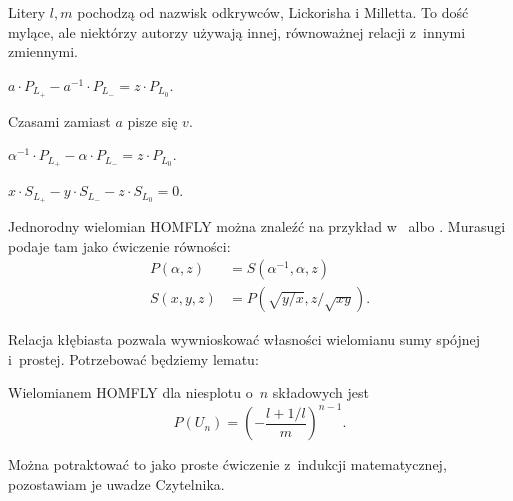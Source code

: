 Litery $l, m$ pochodzą od nazwisk odkrywców, Lickorisha i Milletta.
To dość mylące, ale niektórzy autorzy używają innej, równoważnej relacji z~innymi zmiennymi.

\begin{definition}
    $a \cdot P_{L_+} - a^{-1} \cdot P_{L_-} = z \cdot P_{L_0}$.
\end{definition}

Czasami zamiast $a$ pisze się $v$.

\begin{definition}
    $\alpha^{-1} \cdot P_{L_+} - \alpha \cdot P_{L_-} = z \cdot P_{L_0}$.
\end{definition}

\begin{definition}
    $x \cdot S_{L_+} - y \cdot S_{L_-} - z \cdot S_{L_0} = 0$.
\end{definition}

Jednorodny wielomian HOMFLY można znaleźć na przykład w~\cite[s. 10]{millett88} albo \cite[s. 231]{murasugi96}.
Murasugi podaje tam jako ćwiczenie równości:
\begin{align}
    P(\alpha, z) & = S(\alpha^{-1}, \alpha, z) \\
    S(x, y, z) & = P(\sqrt{y/x}, z/\sqrt{xy}).
\end{align}


Relacja kłębiasta pozwala wywnioskować własności wielomianu sumy spójnej i~prostej.
Potrzebować będziemy lematu:

\begin{lemma}
    \label{lem:homfly_unlinks}
    Wielomianem HOMFLY dla niesplotu o~$n$ składowych jest
    \begin{equation}
        P(U_n) = \left(-\frac{l+1/l}{m}\right)^{n-1}.
    \end{equation}
\end{lemma}

Można potraktować to jako proste ćwiczenie z~indukcji matematycznej, pozostawiam je uwadze Czytelnika.

